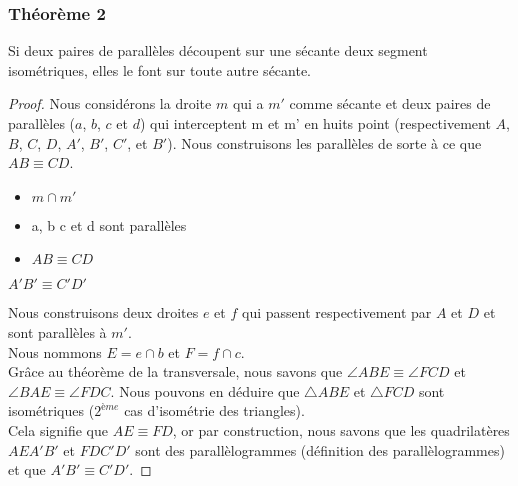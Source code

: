 \documentclass[a4paper,12pt]{article}
\begin{document}
\pagebreak
\subsubsection{Théorème 2}
\begin{theorem}\label{semblableTh2}
Si deux paires de parallèles découpent sur une sécante deux segment isométriques, elles le font sur toute autre sécante.
\end{theorem}

\begin{proof}
Nous considérons la droite $m$ qui a $m'$ comme sécante et deux paires de parallèles ($a$, $b$, $c$ et $d$) qui interceptent m et m' en huits point (respectivement $A$, $B$, $C$, $D$, $A'$, $B'$, $C'$, et $B'$). Nous construisons les parallèles de sorte à ce que $AB \equiv CD$.


\begin{hyp}
\begin{itemize}
    \item $m \cap m'$
    \item a, b c et d sont parallèles
    \item $AB \equiv CD$
\end{itemize}
\end{hyp}
\begin{concl}
$A'B' \equiv C'D'$
\end{concl}
Nous construisons deux droites $e$ et $f$ qui passent respectivement par $A$ et $D$ et sont parallèles à $m'$.\\
Nous nommons $E = e \cap b$ et $F = f \cap c$.\\
Grâce au théorème de la transversale, nous savons que $\angle ABE \equiv \angle FCD$ et $\angle BAE \equiv \angle FDC$. Nous pouvons en déduire que $\triangle ABE$ et $\triangle FCD$ sont isométriques ($2^{ème}$ cas d'isométrie des triangles).\\

Cela signifie que $AE \equiv FD$, or par construction, nous savons que  les quadrilatères $AEA'B'$ et $FDC'D'$ sont des parallèlogrammes (définition des parallèlogrammes) et que $A'B' \equiv C'D'$.
\end{proof}
\end{document}
